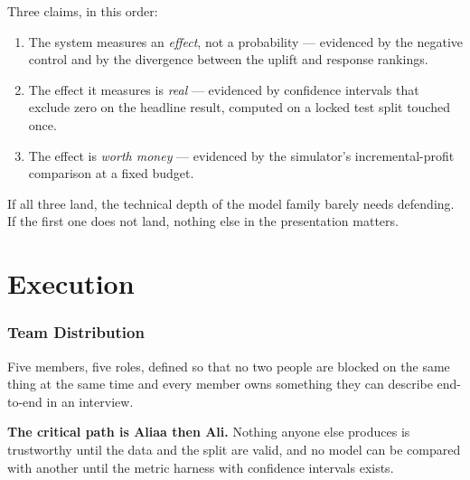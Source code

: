 \documentclass[11pt,a4paper]{article}
\begin{document}
\begin{keybox}
Three claims, in this order:
\begin{enumerate}
\item The system measures an \emph{effect}, not a probability --- evidenced by the negative control
and by the divergence between the uplift and response rankings.
\item The effect it measures is \emph{real} --- evidenced by confidence intervals that exclude zero
on the headline result, computed on a locked test split touched once.
\item The effect is \emph{worth money} --- evidenced by the simulator's incremental-profit
comparison at a fixed budget.
\end{enumerate}
If all three land, the technical depth of the model family barely needs defending. If the first one
does not land, nothing else in the presentation matters.
\end{keybox}
\part{Execution}

\section{Team Distribution}
\label{sec:team}

Five members, five roles, defined so that no two people are blocked on the same thing at the same
time and every member owns something they can describe end-to-end in an interview.

\begin{keybox}
\textbf{The critical path is Aliaa then Ali.} Nothing anyone else produces is trustworthy
until the data and the split are valid, and no model can be compared with another until the metric
harness with confidence intervals exists.
\end{keybox}
\end{document}
